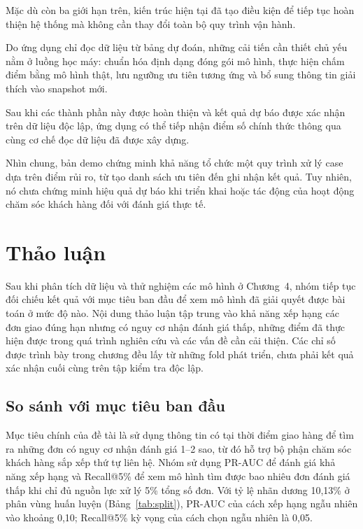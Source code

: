 \documentclass[12pt,a4paper]{report}
\begin{document}
Mặc dù còn ba giới hạn trên, kiến trúc hiện tại đã tạo điều kiện để tiếp tục hoàn thiện hệ thống mà không cần thay đổi toàn bộ quy trình vận hành.

Do ứng dụng chỉ đọc dữ liệu từ bảng dự đoán, những cải tiến cần thiết chủ yếu nằm ở luồng học máy: chuẩn hóa định dạng đóng gói mô hình, thực hiện chấm điểm bằng mô hình thật, lưu ngưỡng ưu tiên tương ứng và bổ sung thông tin giải thích vào snapshot mới.

Sau khi các thành phần này được hoàn thiện và kết quả dự báo được xác nhận trên dữ liệu độc lập, ứng dụng có thể tiếp nhận điểm số chính thức thông qua cùng cơ chế đọc dữ liệu đã được xây dựng.

Nhìn chung, bản demo chứng minh khả năng tổ chức một quy trình xử lý case dựa trên điểm rủi ro, từ tạo danh sách ưu tiên đến ghi nhận kết quả. Tuy nhiên, nó chưa chứng minh hiệu quả dự báo khi triển khai hoặc tác động của hoạt động chăm sóc khách hàng đối với đánh giá thực tế.
 
\chapter{Thảo luận}\label{ch:discussion}

Sau khi phân tích dữ liệu và thử nghiệm các mô hình ở Chương~4, nhóm tiếp tục đối chiếu kết quả với mục tiêu ban đầu để xem mô hình đã giải quyết được bài toán ở mức độ nào. Nội dung thảo luận tập trung vào khả năng xếp hạng các đơn giao đúng hạn nhưng có nguy cơ nhận đánh giá thấp, những điểm đã thực hiện được trong quá trình nghiên cứu và các vấn đề cần cải thiện. Các chỉ số được trình bày trong chương đều lấy từ những fold phát triển, chưa phải kết quả xác nhận cuối cùng trên tập kiểm tra độc lập.

\section{So sánh với mục tiêu ban đầu}\label{sec:disc-goals}

Mục tiêu chính của đề tài là sử dụng thông tin có tại thời điểm giao hàng để tìm ra những đơn có nguy cơ nhận đánh giá 1--2 sao, từ đó hỗ trợ bộ phận chăm sóc khách hàng sắp xếp thứ tự liên hệ. Nhóm sử dụng PR-AUC để đánh giá khả năng xếp hạng và Recall@5\% để xem mô hình tìm được bao nhiêu đơn đánh giá thấp khi chỉ đủ nguồn lực xử lý 5\% tổng số đơn. Với tỷ lệ nhãn dương 10,13\% ở phân vùng huấn luyện (Bảng~\ref{tab:split}), PR-AUC của cách xếp hạng ngẫu nhiên vào khoảng 0,10; Recall@5\% kỳ vọng của cách chọn ngẫu nhiên là 0,05.
\end{document}
